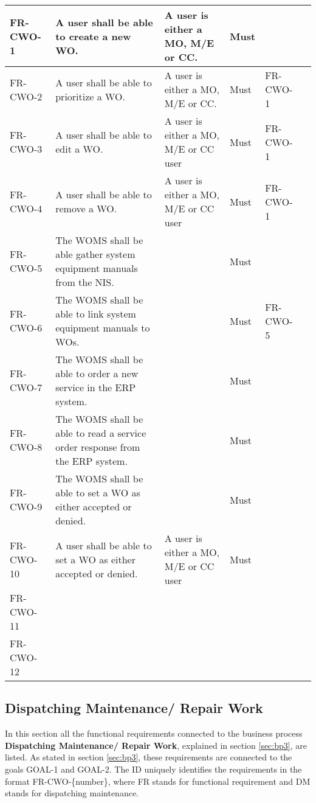 \begin{center}
\begin{longtable}{|l|p{4cm}|p{4cm}|l|l|l|}
FR-CWO-1 & A user shall be able to create a new  WO.& A user is either a MO, M/E or CC. & Must & \\
\hline
FR-CWO-2 & A user shall be able to prioritize a WO. & A user is either a MO, M/E or CC.& Must & FR-CWO-1\\
\hline
FR-CWO-3 & A user shall be able to edit a WO.  & A user is either a MO, M/E or CC user & Must & FR-CWO-1 \\
\hline
FR-CWO-4 & A user shall be able to remove a WO. & A user is either a MO, M/E or CC user & Must & FR-CWO-1 \\
\hline
FR-CWO-5 & The WOMS shall be able gather system equipment manuals from the NIS. & & Must & \\
\hline
FR-CWO-6 & The WOMS shall be able to link system equipment manuals to WOs. & & Must & FR-CWO-5 \\
\hline
FR-CWO-7 & The WOMS shall be able to order a new service in the ERP system. & & Must & \\
\hline
FR-CWO-8 & The WOMS shall be able to read a service order response from the ERP system. & & Must & \\
\hline
FR-CWO-9 & The WOMS shall be able to set a WO as either accepted or denied. & & Must & \\
\hline
FR-CWO-10& A user shall be able to set a WO as either accepted or denied. &A user is either a MO, M/E or CC user & Must & \\
\hline
FR-CWO-11& & & & \\
\hline
FR-CWO-12& & & & \\
\end{longtable}
\end{center}

\subsection{Dispatching Maintenance/ Repair Work}
\label{sub:dispatching_maintenance}	
In this section all the functional requirements connected to the business process \textbf{Dispatching Maintenance/ Repair Work}, explained in section \ref{sec:bp3}, are listed. As stated in section \ref{sec:bp3}, these requirements are connected to the goals GOAL-1 and GOAL-2. The ID uniquely identifies the requirements in the format FR-CWO-\{number\}, where  FR stands for functional requirement and DM stands for dispatching maintenance. 


